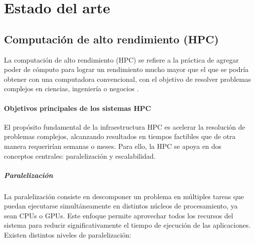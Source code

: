 \chapter{Estado del arte}\label{cap:estado_del_arte}



\section{Computación de alto rendimiento (\acs{HPC})}\label{sec:computacion_alto_rendimiento}

La computación de alto rendimiento (\acs{HPC}) se refiere a la práctica de agregar poder de cómputo para lograr un rendimiento mucho mayor que el que se podría obtener con una computadora convencional, con el objetivo de resolver problemas complejos en ciencias, ingeniería o negocios \cite{sravanthi2014HPC}.

\subsubsection{Objetivos principales de los sistemas \acs{HPC}}

El propósito fundamental de la infraestructura \acs{HPC} es acelerar la resolución de problemas complejos, alcanzando resultados en tiempos factibles que de otra manera requerirían semanas o meses. Para ello, la \acs{HPC} se apoya en dos conceptos centrales: paralelización y escalabilidad.

\paragraph{Paralelización}
La paralelización consiste en descomponer un problema en múltiples tareas que puedan ejecutarse simultáneamente en distintos núcleos de procesamiento, ya sean CPUs o GPUs. Este enfoque permite aprovechar todos los recursos del sistema para reducir significativamente el tiempo de ejecución de las aplicaciones. Existen distintos niveles de paralelización:

